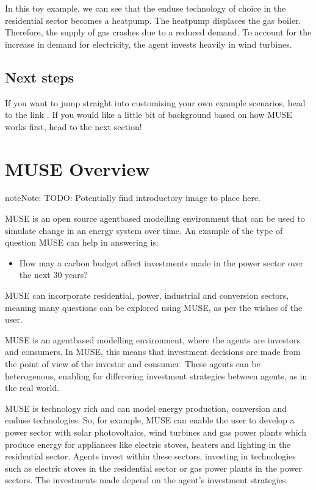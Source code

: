 \documentclass[letterpaper,10pt,english]{sphinxmanual}
\begin{document}
In this toy example, we can see that the end\sphinxhyphen{}use technology of choice in the residential sector becomes a heatpump. The heatpump displaces the gas boiler. Therefore, the supply of gas crashes due to a reduced demand. To account for the increase in demand for electricity, the agent invests heavily in wind turbines.


\section{Next steps}
\label{\detokenize{running-muse-example:Next-steps}}
If you want to jump straight into customising your own example scenarios, head to the link {\hyperref[\detokenize{user-guide/index::doc}]{}}. If you would like a little bit of background based on how MUSE works first, head to the next section!


\chapter{MUSE Overview}
\label{\detokenize{overview:muse-overview}}\label{\detokenize{overview::doc}}
\begin{sphinxadmonition}{note}{Note:}
TODO: Potentially find introductory image to place here.
\end{sphinxadmonition}

MUSE is an open source agent\sphinxhyphen{}based modelling environment that can be used to simulate change in an energy system over time. An example of the type of question MUSE can help in answering is:
\begin{itemize}
\item {} 
How may a carbon budget affect investments made in the power sector over the next 30 years?

\end{itemize}

MUSE can incorporate residential, power, industrial and conversion sectors, meaning many questions can be explored using MUSE, as per the wishes of the user.

MUSE is an agent\sphinxhyphen{}based modelling environment, where the agents are investors and consumers. In MUSE, this means that investment decisions are made from the point of view of the investor and consumer. These agents can be heterogenous, enabling for differering investment strategies between agents, as in the real world.

MUSE is technology rich and can model energy production, conversion and end\sphinxhyphen{}use technologies. So, for example, MUSE can enable the user to develop a power sector with solar photovoltaics, wind turbines and gas power plants which produce energy for appliances like electric stoves, heaters and lighting in the residential sector. Agents invest within these sectors, investing in technologies such as electric stoves in the residential sector or gas power plants in the power sectors. The investments made depend on the agent’s investment strategies.
\end{document}
